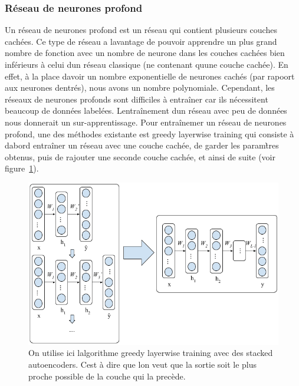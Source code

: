 \documentclass[11pt]{sdm}
\begin{document}
		\subsubsection{R\'eseau de neurones profond\textquotesingle }
			Un r\'eseau de neurones profond est un r\'eseau qui contient plusieurs couches cach\'ees. Ce type de r\'eseau a l\textquotesingle avantage de pouvoir apprendre un plus grand nombre de fonction avec un nombre de neurone dans les couches cach\'ees bien inf\'erieurs \`a celui d\textquotesingle un r\'eseau classique (ne contenant qu\textquotesingle une couche cach\'ee). En effet, \`a la place d\textquotesingle avoir un nombre exponentielle de neurones cach\'es (par rapoort aux neurones d\textquotesingle entr\'es), nous avons un nombre polynomiale.
			Cependant, les r\'eseaux de neurones profonds sont difficiles \`a entra\^iner car ils n\'ecessitent beaucoup de donn\'ees label\'ees. L\textquotesingle entra\^inement d\textquotesingle un r\'eseau avec peu de donn\'ees nous donnerait un sur-apprentissage.
			Pour entra\^inemer un r\'eseau de neurones profond, une des m\'ethodes existante est greedy layerwise training qui consiste \`a d\textquotesingle abord entra\^iner un r\'eseau avec une couche cach\'ee, de garder les param\`tres obtenus, puis de rajouter une seconde couche cach\'ee, et ainsi de suite (voir figure~\ref{fig:trainDeepNet}).

			\begin{figure}[!ht]
				\centering
				\includegraphics[scale=0.5,natwidth=919,natheight=412]{figures/trainDeepNetByGreedyLayerWise.png}
				\caption{On utilise ici l\textquotesingle algorithme greedy layerwise training avec des stacked autoencoders. C\textquotesingle est \`a dire que l\textquotesingle on veut que la sortie soit le plus proche possible de la couche qui la prec\`ede.}
				\label{fig:trainDeepNet}
			\end{figure}
\end{document}
